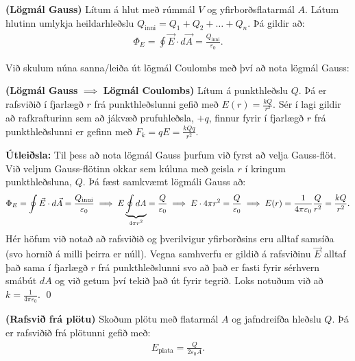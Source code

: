 \ifdefined \wholebook \else\documentclass[oneside]{book}\usepackage{EdlBook}\graphicspath{{figures/}}
\begin{document}
\vspace{0.2cm}


\begin{tcolorbox}
\begin{theorem}
\textbf{(Lögmál Gauss)} Lítum á hlut með rúmmál $V$ og yfirborðsflatarmál $A$. Látum hlutinn umlykja heildarhleðslu $Q_{\text{inni}} = Q_1 + Q_2 + \ldots + Q_n$. Þá gildir að:
\begin{align*}
    \Phi_E = \oint \vec{E} \cdot d\vec{A} = \frac{Q_{\text{inni}}}{\varepsilon_0}.
\end{align*}
\end{theorem}
\end{tcolorbox}


Við skulum núna sanna/leiða út lögmál Coulombs með því að nota lögmál Gauss:

\begin{tcolorbox}
\begin{theorem}
\textbf{(Lögmál Gauss} $\mathbf{\implies}$ \textbf{Lögmál Coulombs)} Lítum á punkthleðslu $Q$. Þá er rafsviðið í fjarlægð $r$ frá punkthleðslunni gefið með $E(r) = \frac{kQ}{r^2}$. Sér í lagi gildir að rafkrafturinn sem að jákvæð prufuhleðsla, $+q$, finnur fyrir í fjarlægð $r$ frá punkthleðslunni er gefinn með $F_k = qE = \frac{kQq}{r^2}$.
\end{theorem}
\end{tcolorbox}

\textbf{Útleiðsla:} Til þess að nota lögmál Gauss þurfum við fyrst að velja Gauss-flöt. Við veljum Gauss-flötinn okkar sem kúluna með geisla $r$ í kringum punkthleðsluna, $Q$. Þá fæst samkvæmt lögmáli Gauss að:
\begin{align*}
    \Phi_E = \oint \vec{E} \cdot d\vec{A} = \frac{Q_{\text{inni}}}{\varepsilon_0} \implies E \underbrace{\oint dA}_\textrm{$4\pi r^2$} = \frac{Q}{\varepsilon_0} \implies E \cdot 4\pi r^2 = \frac{Q}{\varepsilon_0} \implies E(r) = \frac{1}{4\pi \varepsilon_0} \frac{Q}{r^2} = \frac{kQ}{r^2}.
\end{align*}
Hér höfum við notað að rafsviðið og þverilvigur yfirborðsins eru alltaf samsíða (svo hornið á milli þeirra er núll). Vegna samhverfu er gildið á rafsviðinu $\vec{E}$ alltaf það sama í fjarlægð $r$ frá punkthleðslunni svo að það er fasti fyrir sérhvern smábút $dA$ og við getum því tekið það út fyrir tegrið. Loks notuðum við að $k = \frac{1}{4\pi \varepsilon_0}$. \qed

\begin{tcolorbox}
\begin{theorem}
\textbf{(Rafsvið frá plötu)} Skoðum plötu með flatarmál $A$ og jafndreifða hleðslu $Q$. Þá er rafsviðið frá plötunni gefið með:
\begin{align*}
    E_{\text{plata}} = \frac{Q}{2\varepsilon_0 A}.
\end{align*}
\end{theorem}
\end{tcolorbox}
\end{document}
